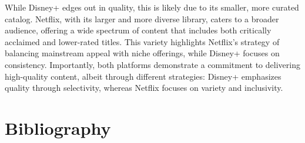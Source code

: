 \documentclass[a4paper, 12pt]{article}
\begin{document}
While Disney+ edges out in quality, this is likely due to its smaller, more curated catalog. Netflix, with its larger and more diverse library, caters to a broader audience, offering a wide spectrum of content that includes both critically acclaimed and lower-rated titles. This variety highlights Netflix's strategy of balancing mainstream appeal with niche offerings, while Disney+ focuses on consistency. Importantly, both platforms demonstrate a commitment to delivering high-quality content, albeit through different strategies: Disney+ emphasizes quality through selectivity, whereas Netflix focuses on variety and inclusivity.


\section{Bibliography}
\end{document}
